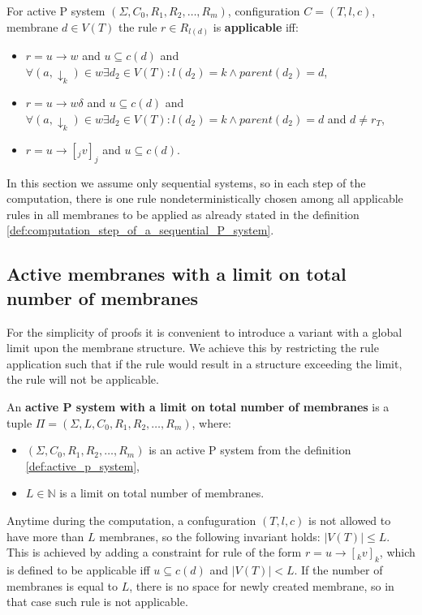 \begin{definition}
  \label{def:applicable_rule_of_active_p_system}
  For active P system $(\Sigma, C_0, R_1, R_2, \dots , R_m)$, configuration $C = (T, l, c)$, membrane $d\in V(T)$ the rule $r\in R_{l(d)}$ is {\bf applicable} iff:
  \begin{itemize}
    \item $r = u\rightarrow w$ and $u\subseteq c(d)$ and $\forall (a,\downarrow_k)\in w \exists d_2\in V(T): l(d_2)=k \wedge parent(d_2) = d$,
    \item $r = u\rightarrow w\delta$ and $u\subseteq c(d)$ and $\forall (a,\downarrow_k)\in w \exists d_2\in V(T): l(d_2)=k \wedge parent(d_2) = d$ and $d\neq r_T$,
    \item $r = u\rightarrow [_j v]_j$ and $u\subseteq c(d)$.
  \end{itemize}
\end{definition}

In this section we assume only sequential systems, so in each step of the computation, there is one rule nondeterministically chosen among all applicable rules in all membranes to be applied as already stated in the definition \ref{def:computation_step_of_a_sequential_P_system}.


\subsection{Active membranes with a limit on total number of membranes} %
\label{sub:active_membranes_with_a_limit_on_total_number_of_membranes}

For the simplicity of proofs it is convenient to introduce a variant with a global limit upon the membrane structure. We achieve this by restricting the rule application such that if the rule would result in a structure exceeding the limit, the rule will not be applicable.

\begin{definition}
  \label{def:active_p_system_with_a_limit_on_total_number_of_membranes}
  An {\bf active P system with a limit on total number of membranes} is a tuple $\Pi = (\Sigma, L, C_0, R_1, R_2, \dots , R_m)$, where:
  \begin{itemize}
    \item $(\Sigma, C_0, R_1, R_2, \dots , R_m)$ is an active P system from the definition \ref{def:active_p_system},
    \item $L\in \mathbb N$ is a limit on total number of membranes.
  \end{itemize}
\end{definition}
Anytime during the computation, a confuguration $(T, l, c)$ is not allowed to have more than $L$ membranes, so the following invariant holds: $|V(T)|\leq L$.
This is achieved by adding a constraint for rule of the form $r = u\rightarrow [_k v]_k$, which is defined to be applicable iff $u\subseteq c(d)$ and $|V(T)|<L$. If the number of membranes is equal to $L$, there is no space for newly created membrane, so in that case such rule is not applicable.

